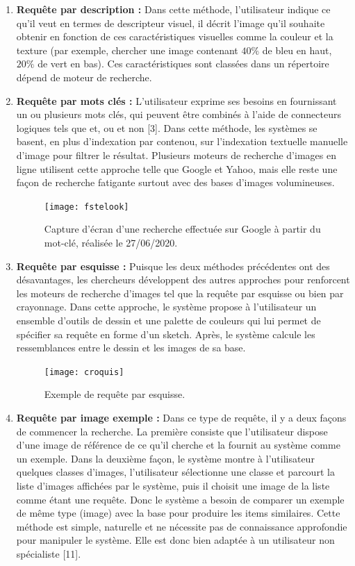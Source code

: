 \begin{enumerate}
	\item \textbf{Requête par description :}
	Dans cette méthode, l’utilisateur indique ce qu’il veut en termes de descripteur visuel, il décrit l’image qu’il souhaite obtenir en fonction de ces caractéristiques visuelles comme la couleur et la texture (par exemple, chercher une image contenant $40\%$ de bleu en haut, $20\%$ de vert en bas).
	Ces caractéristiques sont classées dans un répertoire dépend de moteur de
	recherche.
	
	\item \textbf{Requête par mots clés :}
	L’utilisateur exprime ses besoins en fournissant un ou plusieurs mots clés, qui peuvent être combinés à l'aide de connecteurs logiques tels que et, ou et non [3]. Dans cette méthode, les systèmes se basent, en plus d'indexation par contenou, sur l’indexation textuelle manuelle d'image pour filtrer le résultat. Plusieurs moteurs de
	recherche d’images en ligne utilisent cette approche telle que Google et Yahoo, mais elle reste une façon de recherche fatigante surtout avec des bases d'images volumineuses.
	\begin{figure}[H]
		\centering
		\texttt{[image: fstelook]} 
		\caption{Capture d’écran d’une recherche effectuée sur Google à partir du mot-clé, réalisée le 27/06/2020.}
	\end{figure}

	\item \textbf{Requête par esquisse :} Puisque les deux méthodes précédentes ont des désavantages, les chercheurs développent des autres approches pour renforcent les moteurs
	de recherche d’images tel que la requête par esquisse ou bien par crayonnage. Dans cette approche, le système propose à l’utilisateur un ensemble d'outils de dessin et une palette de couleurs qui lui permet de spécifier sa requête en forme d’un sketch. Après, le système calcule les ressemblances entre le dessin et les images de sa base.
		\begin{figure}[H]
			\centering
			\texttt{[image: croquis]} 
			\caption{Exemple de requête par esquisse.}
		\end{figure}
	
	\item \textbf{Requête par image exemple :}
	Dans ce type de requête, il y a deux façons de commencer la
	recherche. La première consiste que l’utilisateur dispose d’une image de référence de ce qu’il cherche et la fournit au système comme un exemple.
	Dans la deuxième façon, le système montre à l’utilisateur quelques classes d’images, l’utilisateur sélectionne une classe et parcourt la liste d’images affichées par le système, puis il choisit une image de la liste comme étant
	une requête.
	Donc le système a besoin de comparer un exemple de même type (image) avec la base pour produire les items similaires. Cette méthode est simple, naturelle et ne nécessite pas de connaissance approfondie pour manipuler le système. Elle est donc bien adaptée à un utilisateur non spécialiste [11].
	
\end{enumerate}

